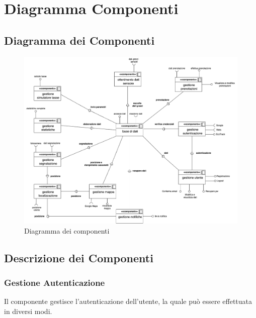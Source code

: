 \section{Diagramma Componenti}

\subsection{Diagramma dei Componenti}
\begin{figure}[H]
    \centering
    \includegraphics[width=1\linewidth]{D2-G1//Img/Component Diagram.png}
    \caption{Diagramma dei componenti}
    \label{fig:enter-label}
\end{figure}

\subsection{Descrizione dei Componenti}

\subsubsection{Gestione Autenticazione}  
Il componente gestisce l'autenticazione dell'utente, la quale può essere effettuata in diversi modi.

